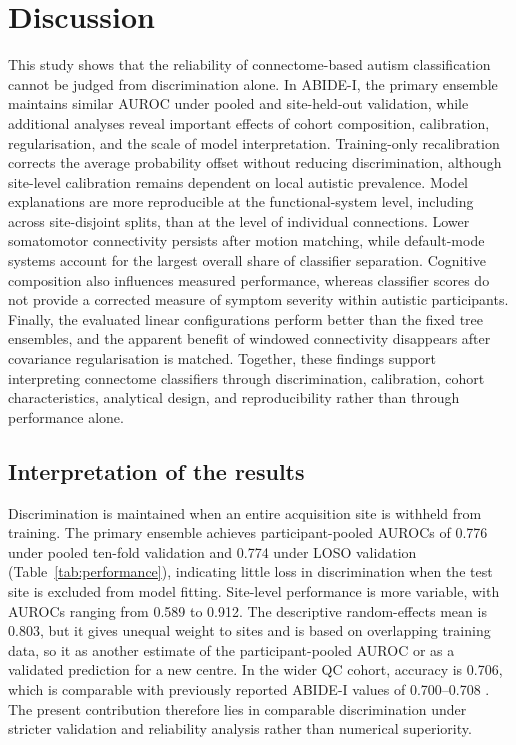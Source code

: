 \section{Discussion}
\label{sec:discussion}

This study shows that the reliability of connectome-based autism classification cannot be judged from discrimination alone. In ABIDE-I, the primary ensemble maintains similar AUROC under pooled and site-held-out validation, while additional analyses reveal important effects of cohort composition, calibration, regularisation, and the scale of model interpretation. Training-only recalibration corrects the average probability offset without reducing discrimination, although site-level calibration remains dependent on local autistic prevalence. Model explanations are more reproducible at the functional-system level, including across site-disjoint splits, than at the level of individual connections. Lower somatomotor connectivity persists after motion matching, while default-mode systems account for the largest overall share of classifier separation. Cognitive composition also influences measured performance, whereas classifier scores do not provide a corrected measure of symptom severity within autistic participants. Finally, the evaluated linear configurations perform better than the fixed tree ensembles, and the apparent benefit of windowed connectivity disappears after covariance regularisation is matched. Together, these findings support interpreting connectome classifiers through discrimination, calibration, cohort characteristics, analytical design, and reproducibility rather than through performance alone.

\subsection{Interpretation of the results}
\label{subsec:discussion-results}

Discrimination is maintained when an entire acquisition site is withheld from training. The primary ensemble achieves participant-pooled AUROCs of 0.776 under pooled ten-fold validation and 0.774 under LOSO validation (Table~\ref{tab:performance}), indicating little loss in discrimination when the test site is excluded from model fitting. Site-level performance is more variable, with AUROCs ranging from 0.589 to 0.912. The descriptive random-effects mean is 0.803, but it gives unequal weight to sites and is based on overlapping training data, so it  as another estimate of the participant-pooled AUROC or as a validated prediction for a new centre. In the wider QC cohort, accuracy is 0.706, which is comparable with previously reported ABIDE-I values of 0.700--0.708 \citep{Heinsfeldetal2018,Eslamietal2019,AlmuqhimSaeed2021}. The present contribution therefore lies in comparable discrimination under stricter validation and reliability analysis rather than numerical superiority.

